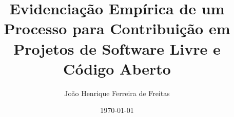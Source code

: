 % 
% 
% 
% 

{
}

\usepackage[brazil]{babel}    %
\usepackage[latin1,utf8]{inputenc}
\usepackage{graphics}          %

\usepackage{times}
\usepackage[T1]{fontenc}
\usepackage{pgf}

\title[Evidenciação de processo para contribuição em SL/CA]{Evidenciação Empírica de um Processo para Contribuição em Projetos de Software Livre e Código Aberto}

\author{João Henrique Ferreira de Freitas}
\date{\today}


